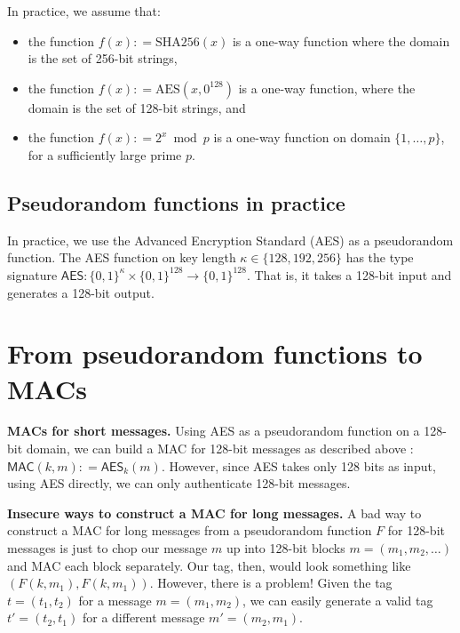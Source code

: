 \documentclass[
  letterpaper,
]{scrbook}
\providecommand{\tightlist}{%
  \setlength{\itemsep}{0pt}\setlength{\parskip}{0pt}}
\newcommand{\zo}{\{0,1\}}
\newcommand{\bin}{\zo}
\newcommand{\deq}{\mathrel{\mathop:}=}
\newcommand{\MAC}{\mathsf{MAC}}
\theoremstyle{definition}
\theoremstyle{plain}
\theoremstyle{plain}
\theoremstyle{remark}
\begin{document}
In practice, we assume that:

\begin{itemize}
\tightlist
\item
  the function \(f(x) \deq \text{SHA256}(x)\) is a one-way function
  where the domain is the set of 256-bit strings,
\item
  the function \(f(x) \deq \text{AES}(x, 0^{128})\) is a one-way
  function, where the domain is the set of 128-bit strings, and
\item
  the function \(f(x) \deq 2^x \bmod p\) is a one-way function on domain
  \(\{1, \dots, p\}\), for a sufficiently large prime \(p\).
\end{itemize}

\subsection{Pseudorandom functions in
practice}\label{pseudorandom-functions-in-practice}

In practice, we use the Advanced Encryption Standard (AES) as a
pseudorandom function. The AES function on key length
\(\kappa \in \{128, 192, 256\}\) has the type signature
\(\mathsf{AES}: \bin^\kappa \times \bin^{128} \rightarrow \bin^{128}\).
That is, it takes a 128-bit input and generates a 128-bit output.


\section{From pseudorandom functions to
MACs}\label{from-pseudorandom-functions-to-macs}

\textbf{MACs for short messages.} Using AES as a pseudorandom function
on a 128-bit domain, we can build a MAC for 128-bit messages as
described above : \(\MAC(k, m) \deq \mathsf{AES}_k(m)\). However, since
AES takes only 128 bits as input, using AES directly, we can only
authenticate 128-bit messages.

\textbf{Insecure ways to construct a MAC for long messages.} A bad way
to construct a MAC for long messages from a pseudorandom function \(F\)
for 128-bit messages is just to chop our message \(m\) up into 128-bit
blocks \(m = (m_1, m_2, \dots)\) and MAC each block separately. Our tag,
then, would look something like \(\left(F(k,m_1), F(k,m_1)\right)\).
However, there is a problem! Given the tag \(t = (t_1, t_2)\) for a
message \(m=(m_1, m_2)\), we can easily generate a valid tag
\(t' = (t_2, t_1)\) for a different message \(m'=(m_2, m_1)\).
\end{document}
